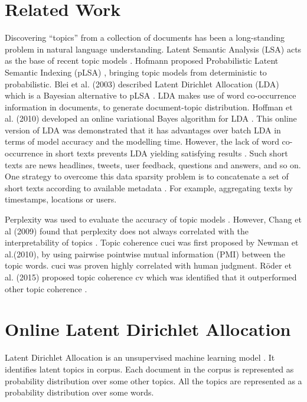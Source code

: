 \documentclass{article} %
\begin{document}
\section{Related Work}
\label{gen_inst}

Discovering “topics” from a collection of documents has been a long-standing problem
in natural language understanding. Latent Semantic Analysis (LSA) acts as the base of
recent topic models \cite{deerwester_indexing_1990}. Hofmann proposed Probabilistic Latent Semantic Indexing (pLSA) \cite{hofmann_probabilistic_2017}, bringing topic models from deterministic to probabilistic. Blei et al. (2003) described Latent Dirichlet Allocation (LDA) which is a Bayesian alternative to pLSA \cite{blei_latent_2003}. LDA makes use of word co-occurrence information in documents, to generate document-topic distribution. Hoffman et al. (2010) developed an online variational Bayes algorithm for LDA \cite{hoffman_online_2010}. This online version of LDA was demonstrated that it has advantages over batch LDA in terms of model accuracy and the modelling time.
However, the lack of word co-occurrence in short texts prevents LDA yielding satisfying
results \cite{li_topic_2016}. Such short texts are news headlines, tweets, user feedback, questions and answers, and so on. One strategy to overcome this data sparsity problem is to concatenate a set of short texts according to available metadata \cite{weng_twitterrank:_2010, hong_empirical_2010, mehrotra_improving_2013}. For example, aggregating texts by timestamps, locations or users. 

Perplexity was used to evaluate the accuracy of topic models \cite{wallach_evaluation_2009}. However, Chang et al (2009) found that perplexity does not always correlated with the interpretability of topics \cite{chang_reading_2009}. Topic coherence c\textunderscore{}uci was first proposed by Newman et al.(2010)\cite{newman_automatic_nodate}, by using pairwise pointwise mutual information (PMI) between the topic words. c\textunderscore{}uci was proven highly correlated with human judgment. Röder et al. (2015) proposed topic coherence c\textunderscore{}v which was identified that it outperformed other topic coherence \cite{roder_exploring_2015}.

\section{Online Latent Dirichlet Allocation}
Latent Dirichlet Allocation is an unsupervised machine learning model \cite{blei_latent_2003}. It identifies latent topics in corpus. Each document in the corpus is represented as probability distribution over some other topics. All the topics are represented as a probability distribution over some words.
\end{document}
